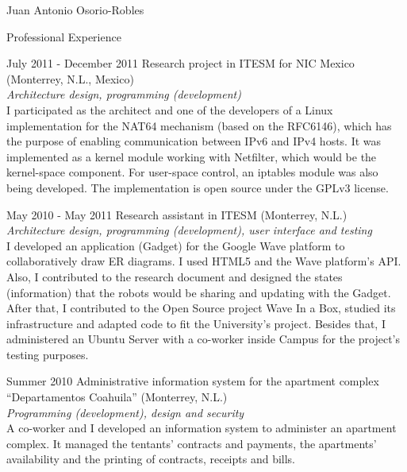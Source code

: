 \documentclass[spanish,10pt,letterpaper]{article}
\begin{document}
\begin{cv}{Juan Antonio Osorio-Robles}
	\begin{cvlist}{Professional Experience}
		\item [July 2011 - December 2011]
			Research project in ITESM for NIC Mexico (Monterrey, N.L., Mexico)
			\\ \emph{Architecture design, programming (development)}
			\\ I participated as the architect and one of the developers of a Linux implementation for the NAT64 mechanism (based on the RFC6146), which has the purpose of enabling communication between IPv6 and IPv4 hosts. It was implemented as a kernel module working with Netfilter, which would be the kernel-space component. For user-space control, an iptables module was also being developed. The implementation is open source under the GPLv3 license.
		\item [May 2010 - May 2011]
			Research assistant in ITESM (Monterrey, N.L.)
			\\ \emph{Architecture design, programming (development), user interface and testing}
			\\ I developed an application (Gadget) for the Google Wave platform to collaboratively draw ER diagrams. I used HTML5 and the Wave platform's API. Also, I contributed to the research document and designed the states (information) that the robots would be sharing and updating with the Gadget. After that, I contributed to the Open Source project Wave In a Box, studied its infrastructure and adapted code to fit the University's project. Besides that, I administered an Ubuntu Server with a co-worker inside Campus for the project's testing purposes.
		\item [Summer 2010]
			Administrative information system for the apartment complex ``Departamentos Coahuila'' (Monterrey, N.L.)
			\\ \emph{Programming (development), design and security}
			\\ A co-worker and I developed an information system to administer an apartment complex. It managed the tentants' contracts and payments, the apartments' availability and the printing of contracts, receipts and bills.
			
	\end{cvlist}


\end{cv}
\end{document}
